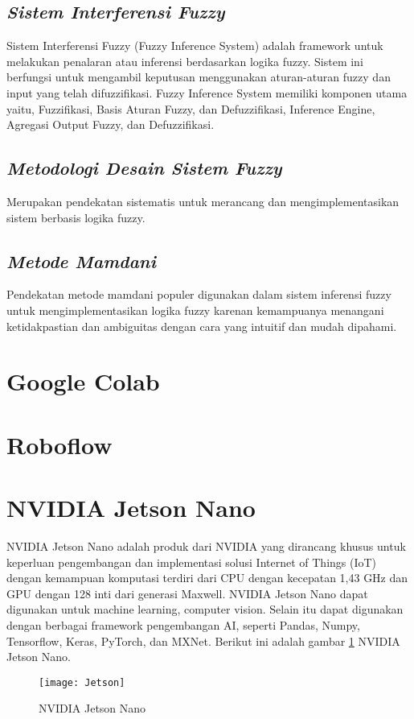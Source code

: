 \subsection{\textit{Sistem Interferensi Fuzzy}}
Sistem Interferensi Fuzzy (Fuzzy Inference System)  adalah framework untuk melakukan  penalaran atau inferensi berdasarkan logika fuzzy. Sistem ini berfungsi untuk mengambil keputusan menggunakan aturan-aturan fuzzy dan input yang telah difuzzifikasi.  Fuzzy Inference System memiliki komponen utama yaitu, Fuzzifikasi, Basis Aturan Fuzzy, dan 	Defuzzifikasi, Inference Engine, Agregasi Output Fuzzy, dan Defuzzifikasi.
\subsection{\textit{Metodologi Desain Sistem Fuzzy}}
Merupakan  pendekatan sistematis untuk merancang dan mengimplementasikan sistem berbasis logika fuzzy. 
\subsection{\textit{Metode Mamdani}}
Pendekatan metode mamdani populer digunakan dalam sistem inferensi fuzzy untuk mengimplementasikan logika fuzzy karenan kemampuanya menangani ketidakpastian dan ambiguitas dengan cara yang intuitif dan mudah dipahami. 

\section{Google Colab}
\section{Roboflow}
\section{NVIDIA Jetson Nano}
NVIDIA Jetson Nano adalah produk dari NVIDIA yang dirancang khusus untuk keperluan pengembangan dan implementasi solusi Internet of Things (IoT) dengan kemampuan komputasi terdiri dari CPU dengan kecepatan 1,43 GHz dan GPU dengan 128 inti dari generasi Maxwell. NVIDIA Jetson Nano dapat digunakan untuk machine learning, computer vision. Selain itu dapat digunakan dengan berbagai framework pengembangan AI, seperti Pandas, Numpy, Tensorflow, Keras, PyTorch, dan MXNet. Berikut ini adalah gambar \cref{fig:jetson} NVIDIA Jetson Nano.

\begin{figure}[H]
	\centering
	\texttt{[image: Jetson]}
	\caption{NVIDIA Jetson Nano}
	\label{fig:jetson}
\end{figure}

